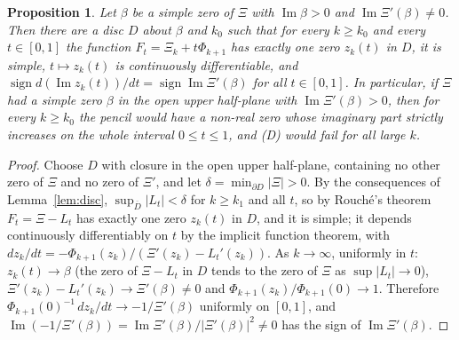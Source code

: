 \documentclass[11pt]{article}
\theoremstyle{plain}
\newtheorem{proposition}[theorem]{Proposition}
\theoremstyle{definition}
\theoremstyle{remark}
\newcommand{\im}{\operatorname{Im}}
\begin{document}
\begin{proposition}\label{prop:offaxis}
Let $\beta$ be a simple zero of $\Xi$ with $\im\beta > 0$ and
$\im\Xi'(\beta) \ne 0$. Then there are a disc $D$ about $\beta$ and $k_0$ such
that for every $k \ge k_0$ and every $t \in [0,1]$ the function
$F_t = \Xi_k + t\Phi_{k+1}$ has exactly one zero $z_k(t)$ in $D$, it is
simple, $t \mapsto z_k(t)$ is continuously differentiable, and
$\operatorname{sign} d(\im z_k(t))/dt = \operatorname{sign}\im\Xi'(\beta)$
for all $t \in [0,1]$. In particular, if $\Xi$ had a simple zero $\beta$ in the open upper half-plane
with $\im\Xi'(\beta) > 0$, then for every $k \ge k_0$ the pencil would have a
non-real zero whose imaginary part strictly increases on the whole interval
$0 \le t \le 1$, and (D) would fail for all large $k$.
\end{proposition}

\begin{proof}
Choose $D$ with closure in the open upper half-plane, containing no other zero
of $\Xi$ and no zero of $\Xi'$, and let $\delta = \min_{\partial D}|\Xi| > 0$.
By the consequences of Lemma~\ref{lem:disc}, $\sup_{\overline D}|L_t| < \delta$
for $k \ge k_1$ and all $t$, so by Rouch\'e's theorem $F_t = \Xi - L_t$ has
exactly one zero $z_k(t)$ in $D$, and it is simple; it depends continuously
differentiably on $t$ by the implicit function theorem, with
$dz_k/dt = -\Phi_{k+1}(z_k)/(\Xi'(z_k) - L_t'(z_k))$. As $k \to \infty$,
uniformly in $t$: $z_k(t) \to \beta$ (the zero of $\Xi - L_t$ in $D$ tends to
the zero of $\Xi$ as $\sup|L_t| \to 0$),
$\Xi'(z_k) - L_t'(z_k) \to \Xi'(\beta) \ne 0$ and
$\Phi_{k+1}(z_k)/\Phi_{k+1}(0) \to 1$. Therefore
$\Phi_{k+1}(0)^{-1}\,dz_k/dt \to -1/\Xi'(\beta)$ uniformly on $[0,1]$, and
$\im(-1/\Xi'(\beta)) = \im\Xi'(\beta)/|\Xi'(\beta)|^2 \ne 0$ has the sign
of $\im\Xi'(\beta)$.
\end{proof}
\end{document}
